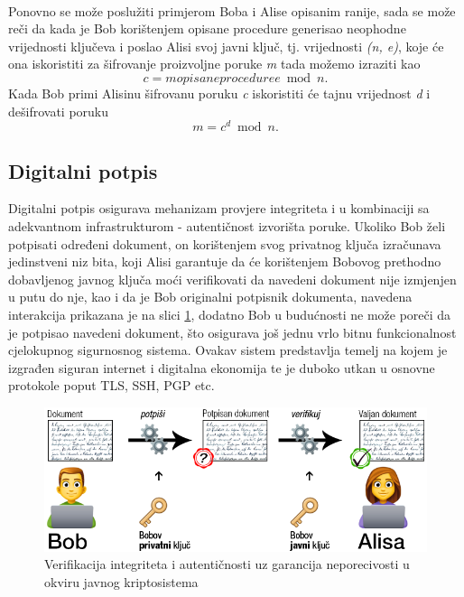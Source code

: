 \paragraph*{}
Ponovno se može poslužiti primjerom Boba i Alise opisanim ranije, sada se može reči da kada je Bob korištenjem opisane procedure generisao neophodne vrijednosti ključeva i poslao Alisi svoj javni ključ, tj. vrijednosti \textit{(n, e)}, koje će ona iskoristiti za šifrovanje proizvoljne poruke \textit{m} tada možemo izraziti kao \[c = mopisane procedure e\bmod n.\] Kada Bob primi Alisinu šifrovanu poruku \textit{c} iskoristiti će tajnu vrijednost \textit{d} i dešifrovati poruku \[m = c^d\bmod n.\]

\subsection{Digitalni potpis}
Digitalni potpis osigurava mehanizam provjere integriteta i u kombinaciji sa adekvantnom infrastrukturom - autentičnost izvorišta poruke. Ukoliko Bob želi potpisati određeni dokument, on korištenjem svog privatnog ključa izračunava jedinstveni niz bita, koji Alisi garantuje da će korištenjem Bobovog prethodno dobavljenog javnog ključa moći verifikovati da navedeni dokument nije izmjenjen u putu do nje, kao i da je Bob originalni potpisnik dokumenta, navedena interakcija prikazana je na slici \ref{fig:alice_bob_sig}, dodatno Bob u budućnosti ne može poreči da je potpisao navedeni dokument, što osigurava još jednu vrlo bitnu funkcionalnost cjelokupnog sigurnosnog sistema. Ovakav sistem predstavlja temelj na kojem je izgrađen siguran internet i digitalna ekonomija te je duboko utkan u osnovne protokole poput TLS, SSH, PGP etc.

\begin{figure}[H]
    \centering
    \includegraphics[width=1.0\textwidth]{material/bob_alice_sig}
    \caption{Verifikacija integriteta i autentičnosti uz garancija neporecivosti u okviru javnog kriptosistema}
    \label{fig:alice_bob_sig}
\end{figure}

